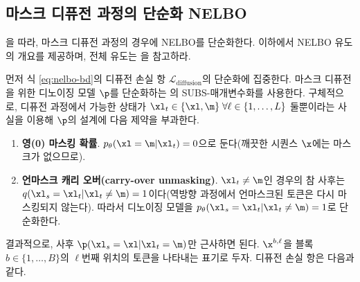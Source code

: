 \documentclass{article} %
\begin{document}
\subsection{마스크 디퓨전 과정의 단순화 NELBO} \label{supp:elbo}


\cite{sahoo2024simple, shi2024simplified, ou2025your}을 따라, 마스크 디퓨전 과정의 경우에 NELBO를 단순화한다. 이하에서 NELBO 유도의 개요를 제공하며, 전체 유도는 \cite{sahoo2024simple, shi2024simplified, ou2025your}을 참고하라.


먼저 식 \ref{eq:nelbo-bd}의 디퓨전 손실 항 $\mathcal{L}_\text{diffusion}$의 단순화에 집중한다. 마스크 디퓨전을 위한 디노이징 모델 $\p$를 단순화하는 \citet{sahoo2024diffusion}의 SUBS-매개변수화를 사용한다. 구체적으로, 디퓨전 과정에서 가능한 상태가 $\xl_t \in \{ \xl, \m \} \; \forall \ell \in \{1, \dots, L\}$ 둘뿐이라는 사실을 이용해 $\p$의 설계에 다음 제약을 부과한다.
\begin{enumerate}
    \item \textbf{영(0) 마스킹 확률}. $p_\theta(\xl = \m | \xl_t) = 0$으로 둔다(깨끗한 시퀀스 $\x$에는 마스크가 없으므로).
    \item \textbf{언마스크 캐리 오버(carry-over unmasking)}. $\xl_t \neq \m$인 경우의 참 사후는 $q(\xl_s = \xl_t | \xl_t \neq \m) = 1$이다(역방향 과정에서 언마스크된 토큰은 다시 마스킹되지 않는다). 따라서 디노이징 모델을 $p_\theta (\xl_s = \xl_t | \xl_t \neq \m) = 1$로 단순화한다.
\end{enumerate}
결과적으로, 사후 $\p(\xl_s = \xl | \xl_t = \m)$만 근사하면 된다. $\x^{b, \ell}$을 블록 $b \in \{1, \dots, B\}$의 $\ell$번째 위치의 토큰을 나타내는 표기로 두자. 디퓨전 손실 항은 다음과 같다.
\end{document}

